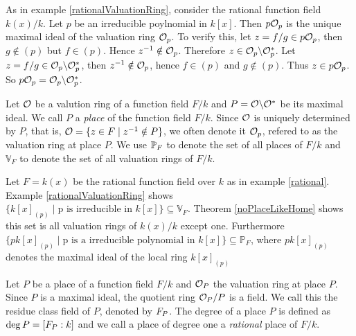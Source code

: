 \begin{example}
    As in example \ref{rationalValuationRing}, consider the rational 
    function field $k(x)/k$.
    Let $p$ be an irreducible poylnomial in $k[x]$. 
    Then $p\mathcal{O}_p$ is the unique maximal ideal
    of the valuation ring $\mathcal{O}_p$. To verify this, 
    let $z = f/g \in p\mathcal{O}_p$, then $g \notin (p)$ but $f \in (p)$. 
    Hence $z^{-1} \notin \mathcal{O}_p$. Therefore $z \in \mathcal{O}_p \backslash \mathcal{O}_p^*$. Let 
    $z = f/g \in \mathcal{O}_p \backslash \mathcal{O}_p^*$, then $z^{-1} \notin \mathcal{O}_p$, hence $f \in (p)$ and 
    $g \notin (p)$. Thus $z \in p\mathcal{O}_p$. So $p\mathcal{O}_p = \mathcal{O}_p \backslash \mathcal{O}_p^*$. 
\end{example}

\begin{definition}
    Let $\mathcal{O}$ be a valution ring of a function field $F/k$ and 
    $P= \mathcal{O} \backslash \mathcal{O}^* $ be its maximal ideal. We call $P$ a \textit{place} of 
    the function field $F/k$. Since $\mathcal{O}$ is uniquely determined by 
    $P$, that is, $\mathcal{O} = \lbrace z \in F \mid z^{-1} \notin P \rbrace$, we 
    often denote it $\mathcal{O}_p$, refered to as the valuation ring at place 
    $P$. We use $\mathbb{P}_F$ to denote the set of all places of $F/k$ 
    and $\mathbb{V}_F$ to denote the set of all valuation rings of $F/k$.
\end{definition}

\begin{example}
	Let $F=k(x)$ be the rational function field over $k$ as in example \ref{rational}.
	Example \ref{rationalValuationRing} shows $ \lbrace k[x]_{(p)} \mid 
	\text{p is irreducible in } k[x] \rbrace \subseteq \mathbb{V}_F  $.
	Theorem \ref{noPlaceLikeHome} shows this set is all valuation 
	rings of $k(x)/k$ except one. Furthermore $
	\lbrace pk[x]_{(p)} \mid 
	\text{p is a irreducible polynomial in } k[x] \rbrace \subseteq \mathbb{P}_F
	$, where $pk[x]_{(p)}$ denotes the maximal ideal of the local ring $k[x]_{(p)}$
\end{example}

\begin{definition}
	Let $P$ be a place of a function field $F/k$ and $\mathcal{O}_P$ the valuation ring 
	at place $P$. Since $P$ is a maximal ideal, the quotient ring $\mathcal{O}_P/P$ is a 
	field. We call this the residue class field of $P$, denoted by $F_P$. The
	degree of a place $P$ is defined as $\deg P = [F_P : k]$ and we call a place
	of degree one a \textit{rational} place of $F/k$.
\end{definition}

